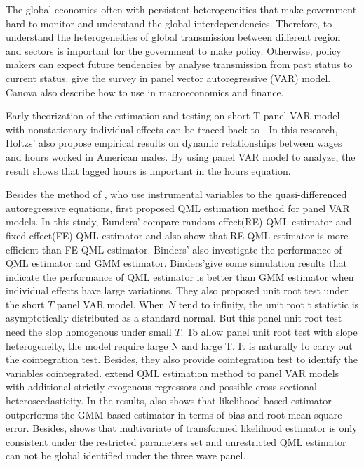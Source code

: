 \documentclass[12pt,a4paper,hyperref]{article}
\begin{document}
The global economics often with persistent heterogeneities that make government hard to monitor and understand the global interdependencies. Therefore, to understand the heterogeneities of global transmission between different region and sectors is important for the government to make policy. Otherwise, policy makers can expect future tendencies by analyse transmission from past status to current status. \citet{Canova:2013} give the survey in panel vector autoregressive (VAR) model. Canova also describe how to use in macroeconomics and finance.

Early theorization of the estimation and testing on short T panel VAR model with nonstationary individual effects can be traced back to \citet{Holtz:1988}. In this research,
Holtzs’ also propose empirical results on dynamic relationships between wages and hours worked in American males. By using panel VAR model to analyze, the result shows that lagged hours is important in the hours equation.

Besides the method of \citet{Holtz:1988}, who use instrumental variables to the quasi-differenced autoregressive equations, \citet{Binder:2005} first proposed QML estimation method for panel VAR models. In this study, Bunders’ compare random effect(RE) QML estimator and fixed effect(FE) QML estimator and also show that RE QML estimator is more efficient than FE QML estimator.
Binders’ also investigate the performance of QML estimator and GMM estimator. Binders’give some simulation results that indicate the performance of QML estimator is better than GMM estimator when individual effects have large variations. They also proposed unit root test under the short $T$ panel VAR model. When $N$ tend to infinity, the unit root t statistic is asymptotically distributed as a standard normal. But this panel unit root test need the slop homogenous under small $T$. To allow panel unit root test with slope heterogeneity, the model require large N and large T. It is naturally to carry out the cointegration test. Besides, they also provide cointegration test to identify the variables cointegrated.\citet{Juodis:2017} extend QML estimation method to panel VAR models with additional strictly exogenous regressors and possible cross-sectional heteroscedasticity. In the results, \citet{ Juodis:2017} also shows that likelihood based estimator outperforms the GMM based estimator in terms of bias and root mean square error. Besides, \citet{ Juodis:2017} shows that multivariate of transformed likelihood estimator is only consistent under the restricted parameters set and unrestricted QML estimator can not be global identified under the three wave panel.
\end{document}
